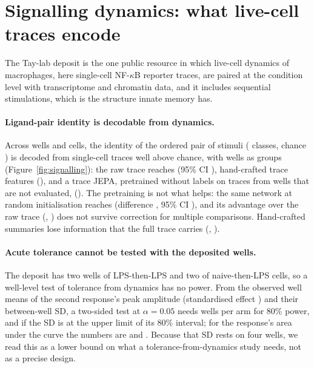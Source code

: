 \section{Signalling dynamics: what live-cell traces encode}
\label{sec:partB}
The Tay-lab deposit \citep{wang2025} is the one public resource in which live-cell
dynamics of macrophages, here single-cell NF-\(\kappa\)B reporter traces, are paired at the
condition level with transcriptome and chromatin data, and it includes sequential
stimulations, which is the structure innate memory has.

\paragraph{Ligand-pair identity is decodable from dynamics.} Across 
wells and  cells, the identity of the ordered pair of stimuli
( classes, chance ) is decoded from single-cell
traces well above chance, with wells as groups (Figure~\ref{fig:signalling}): the raw trace
reaches  (95\% CI ), hand-crafted trace
features  (), and a trace JEPA, pretrained
without labels on  traces from  wells that are not
evaluated,  (). The pretraining is not
what helps: the same network at random initialisation reaches
 (difference ,
95\% CI ), and its advantage over the raw trace
(, ) does not survive correction for
multiple comparisons. Hand-crafted summaries lose information that the full trace carries
(, ).

\paragraph{Acute tolerance cannot be tested with the deposited wells.} The deposit has two
wells of LPS-then-LPS and two of naive-then-LPS cells, so a well-level test of tolerance
from dynamics has no power. From the observed well means of the second response's peak
amplitude (standardised effect ) and their between-well SD, a
two-sided test at $\alpha=0.05$ needs  wells per arm for 80\%
power, and  if the SD is at the upper limit of its 80\%
interval; for the response's area under the curve the numbers are  and
. Because that SD rests on four wells, we read this as a lower bound on
what a tolerance-from-dynamics study needs, not as a precise design.

